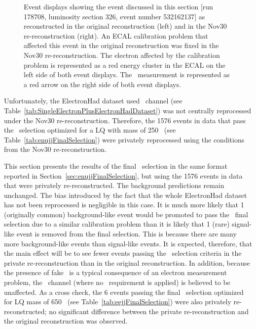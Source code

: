\begin{figure}[htbp]
\begin{center}
\begin{tabular}{cc}
    \end{tabular}
    \caption{Event displays showing the event discussed in this section 
      [run 178708, luminosity section 326, event number 532162137] as reconstructed in the original reconstruction (left) and in the
      Nov30 re-reconstruction (right).
      An ECAL calibration problem that affected this event in the original reconstruction 
      was fixed in the Nov30 re-reconstruction.
      The electron affected by the calibration problem is represented as a red energy cluster in the ECAL
      on the left side of both event displays.
      The \met~measurement is represented as a red arrow on the right side of both event displays.
    }
    \label{fig:problematicEvent}
  \end{center}
\end{figure}

Unfortunately, the ElectronHad dataset used \enujj~channel (see Table~\ref{tab:SingleElectronPlusElectronHadDataset})
was not centrally reprocessed under the Nov30 re-reconstruction.
Therefore, the 1576 events in data that pass 
the \enujj~selection optimized for a LQ with mass of 250 \GeV~(see 
Table~\ref{tab:enujjFinalSelection})
were privately reprocessed using the conditions from the Nov30 re-reconstruction.

This section presents the results of the final \enujj~selection in the same 
format reported in Section~\ref{sec:enujjFinalSelection}, but 
using the 1576 events in data that were privately re-reconstructed.
The background predictions remain unchanged.
The bias introduced by the fact that the 
whole ElectronHad dataset has not been reprocessed is negligible 
in this case. 
It is much more likely that 1 (originally common) background-like event would be promoted to pass 
the \enujj~final selection due to a similar calibration problem than it is likely that
1 (rare) signal-like event is removed from the final selection.
This is because there are many more background-like events than signal-like events.
It is expected, therefore, that the main effect will be to see fewer events 
passing the \enujj~selection criteria in the private re-reconstruction than in the original reconstruction.
In addition, because the presence of fake \MET~is 
a typical consequence of an electron measurement problem, the \eejj~channel (where no \MET~requirement is applied) 
is believed to be unaffected. As a cross check, 
the 6 events passing the final \eejj~selection optimized for LQ mass of 650 \GeV~(see 
Table~\ref{tab:eejjFinalSelection}) were also privately re-reconstructed;
no significant difference between the private re-reconstruction and the original reconstruction was observed.
     
